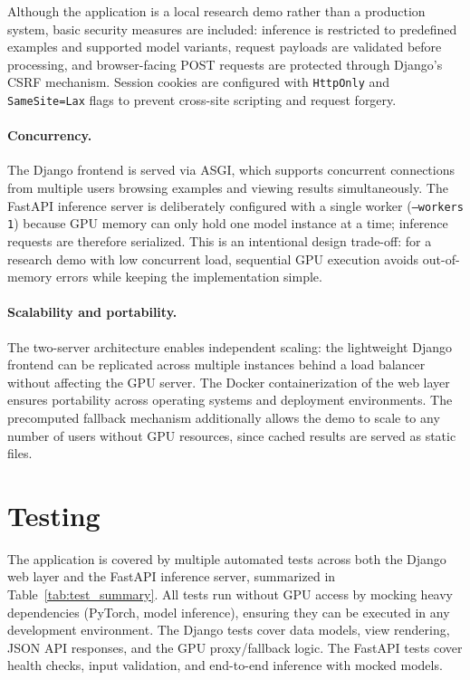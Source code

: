 Although the application is a local research demo rather than a production system, basic security measures are included: inference is restricted to predefined examples and supported model variants, request payloads are validated before processing, and browser-facing POST requests are protected through Django's CSRF mechanism. Session cookies are configured with \texttt{HttpOnly} and \texttt{SameSite=Lax} flags to prevent cross-site scripting and request forgery.

\paragraph{Concurrency.} The Django frontend is served via ASGI, which supports concurrent connections from multiple users browsing examples and viewing results simultaneously. The FastAPI inference server is deliberately configured with a single worker (\texttt{--workers 1}) because GPU memory can only hold one model instance at a time; inference requests are therefore serialized. This is an intentional design trade-off: for a research demo with low concurrent load, sequential GPU execution avoids out-of-memory errors while keeping the implementation simple.

\paragraph{Scalability and portability.} The two-server architecture enables independent scaling: the lightweight Django frontend can be replicated across multiple instances behind a load balancer without affecting the GPU server. The Docker containerization of the web layer ensures portability across operating systems and deployment environments. The precomputed fallback mechanism additionally allows the demo to scale to any number of users without GPU resources, since cached results are served as static files.

\section{Testing}

The application is covered by multiple automated tests across both the Django web layer and the FastAPI inference server, summarized in Table~\ref{tab:test_summary}. All tests run without GPU access by mocking heavy dependencies (PyTorch, model inference), ensuring they can be executed in any development environment. The Django tests cover data models, view rendering, JSON API responses, and the GPU proxy/fallback logic. The FastAPI tests cover health checks, input validation, and end-to-end inference with mocked models.


